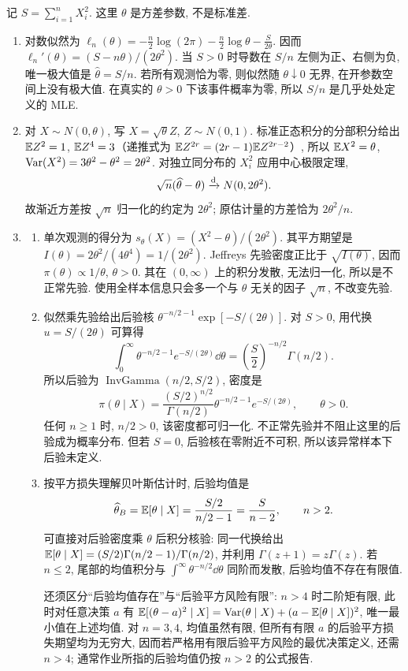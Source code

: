 \begin{solution}
记 $S=\sum_{i=1}^nX_i^2$. 这里 $\theta$ 是方差参数, 不是标准差.
\begin{enumerate}[label=\arabic*.]
\item 对数似然为 $\ell_n(\theta)=-\frac n2\log(2\pi)-\frac n2\log\theta-\frac S{2\theta}$. 因而 $\ell_n'(\theta)=(S-n\theta)/(2\theta^2)$. 当 $S>0$ 时导数在 $S/n$ 左侧为正、右侧为负, 唯一极大值是 $\widehat\theta=S/n$. 若所有观测恰为零, 则似然随 $\theta\downarrow0$ 无界, 在开参数空间上没有极大值. 在真实的 $\theta>0$ 下该事件概率为零, 所以 $S/n$ 是几乎处处定义的 MLE.
\item 对 $X\sim N(0,\theta)$, 写 $X=\sqrt\theta Z$, $Z\sim N(0,1)$. 标准正态积分的分部积分给出 $\mathbb E Z^2=1$, $\mathbb E Z^4=3$（递推式为 $\mathbb E Z^{2r}=(2r-1)\mathbb E Z^{2r-2}$）, 所以 $\mathbb E X^2=\theta$, $\operatorname{Var}(X^2)=3\theta^2-\theta^2=2\theta^2$. 对独立同分布的 $X_i^2$ 应用中心极限定理,
\[
\sqrt n(\widehat\theta-\theta)\xrightarrow{\mathrm d} N(0,2\theta^2).
\]
故渐近方差按 $\sqrt n$ 归一化的约定为 $2\theta^2$; 原估计量的方差恰为 $2\theta^2/n$.
\item
\begin{enumerate}[label=\alph*)]
\item 单次观测的得分为 $s_\theta(X)=(X^2-\theta)/(2\theta^2)$. 其平方期望是 $I(\theta)=2\theta^2/(4\theta^4)=1/(2\theta^2)$. Jeffreys 先验密度正比于 $\sqrt{I(\theta)}$, 因而 $\pi(\theta)\propto1/\theta$, $\theta>0$. 其在 $(0,\infty)$ 上的积分发散, 无法归一化, 所以是不正常先验. 使用全样本信息只会多一个与 $\theta$ 无关的因子 $\sqrt n$, 不改变先验.
\item 似然乘先验给出后验核 $\theta^{-n/2-1}\exp[-S/(2\theta)]$. 对 $S>0$, 用代换 $u=S/(2\theta)$ 可算得
\[
\int_0^\infty\theta^{-n/2-1}e^{-S/(2\theta)}\dd\theta
=\left(\frac S2\right)^{-n/2}\Gamma(n/2).
\]
所以后验为 $\operatorname{InvGamma}(n/2,S/2)$, 密度是
\[
\pi(\theta\mid X)=\frac{(S/2)^{n/2}}{\Gamma(n/2)}
\theta^{-n/2-1}e^{-S/(2\theta)},\qquad\theta>0.
\]
任何 $n\ge1$ 时, $n/2>0$, 该密度都可归一化. 不正常先验并不阻止这里的后验成为概率分布. 但若 $S=0$, 后验核在零附近不可积, 所以该异常样本下后验未定义.
\item 按平方损失理解贝叶斯估计时, 后验均值是
\[
\widehat\theta_B=\mathbb E[\theta\mid X]
=\frac{S/2}{n/2-1}=\frac S{n-2},\qquad n>2.
\]
可直接对后验密度乘 $\theta$ 后积分核验: 同一代换给出 $\mathbb E[\theta\mid X]=(S/2)\Gamma(n/2-1)/\Gamma(n/2)$, 并利用 $\Gamma(z+1)=z\Gamma(z)$. 若 $n\le2$, 尾部的均值积分与 $\int^\infty\theta^{-n/2}\dd\theta$ 同阶而发散, 后验均值不存在有限值.

还须区分“后验均值存在”与“后验平方风险有限”: $n>4$ 时二阶矩有限, 此时对任意决策 $a$ 有 $\mathbb E[(\theta-a)^2\mid X]=\operatorname{Var}(\theta\mid X)+(a-\mathbb E[\theta\mid X])^2$, 唯一最小值在上述均值. 对 $n=3,4$, 均值虽然有限, 但所有有限 $a$ 的后验平方损失期望均为无穷大, 因而若严格用有限后验平方风险的最优决策定义, 还需 $n>4$; 通常作业所指的后验均值仍按 $n>2$ 的公式报告.
\end{enumerate}
\end{enumerate}
\end{solution}
